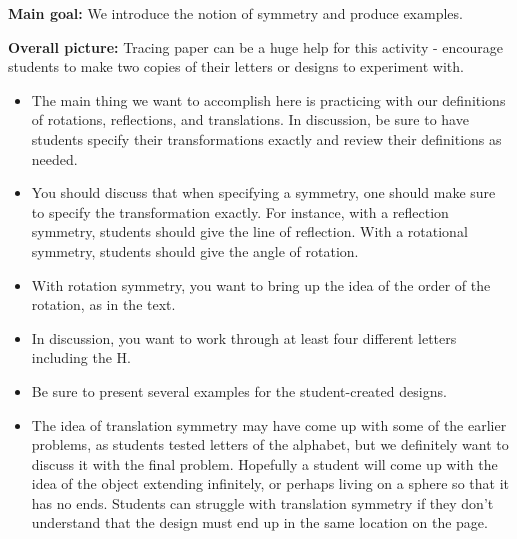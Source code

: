 \documentclass{ximera}
\begin{document}
\newpage
\begin{instructorNotes}

{\bf Main goal:} We introduce the notion of symmetry and produce examples.

{\bf Overall picture:} Tracing paper can be a huge help for this activity - encourage students to make two copies of their letters or designs to experiment with.

\begin{itemize}
	\item The main thing we want to accomplish here is practicing with our definitions of rotations, reflections, and translations. In discussion, be sure to have students specify their transformations exactly and review their definitions as needed.
	\item You should discuss that when specifying a symmetry, one should make sure to specify the transformation exactly.  For instance, with a reflection symmetry, students should give the line of reflection.  With a rotational symmetry, students should give the angle of rotation.
	\item With rotation symmetry, you want to bring up the idea of the order of the rotation, as in the text.
	\item In discussion, you want to work through at least four different letters including the H.
	\item Be sure to present several examples for the student-created designs.
	\item The idea of translation symmetry may have come up with some of the earlier problems, as students tested letters of the alphabet, but we definitely want to discuss it with the final problem. Hopefully a student will come up with the idea of the object extending infinitely, or perhaps living on a sphere so that it has no ends. Students can struggle with translation symmetry if they don't understand that the design must end up in the same location on the page. 
\end{itemize}


\end{instructorNotes}
\end{document}
